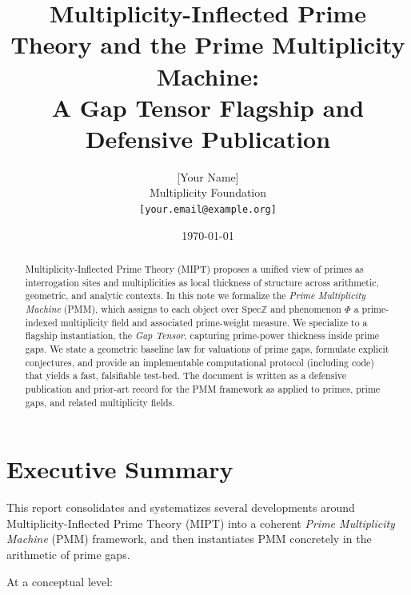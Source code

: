 \documentclass[11pt]{article}
\title{Multiplicity-Inflected Prime Theory and the Prime Multiplicity Machine:\\
A Gap Tensor Flagship and Defensive Publication}
\author{%
  [Your Name] \\
  \small{Multiplicity Foundation}\\
  \small{\texttt{[your.email@example.org]}}
}
\date{\today}
\theoremstyle{definition}
\theoremstyle{plain}
\theoremstyle{remark}
\newcommand{\Spec}{\mathrm{Spec}}
\newcommand{\ZZ}{\mathbb{Z}}
\newcommand{\1}{\mathbb{1}}
\begin{document}
\maketitle

\begin{abstract}
Multiplicity-Inflected Prime Theory (MIPT) proposes a unified view of primes as interrogation sites and multiplicities as local thickness of structure across arithmetic, geometric, and analytic contexts. In this note we formalize the \emph{Prime Multiplicity Machine} (PMM), which assigns to each object over \(\Spec \ZZ\) and phenomenon \(\Phi\) a prime-indexed multiplicity field and associated prime-weight measure. We specialize to a flagship instantiation, the \emph{Gap Tensor}, capturing prime-power thickness inside prime gaps. We state a geometric baseline law for valuations of prime gaps, formulate explicit conjectures, and provide an implementable computational protocol (including code) that yields a fast, falsifiable test-bed. The document is written as a defensive publication and prior-art record for the PMM framework as applied to primes, prime gaps, and related multiplicity fields.
\end{abstract}
\newpage
\tableofcontents

\section{Executive Summary}

This report consolidates and systematizes several developments around Multiplicity-Inflected Prime Theory (MIPT) into a coherent \emph{Prime Multiplicity Machine} (PMM) framework, and then instantiates PMM concretely in the arithmetic of prime gaps.

\medskip

At a conceptual level:
\end{document}
